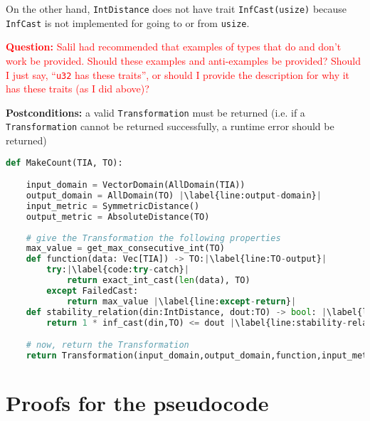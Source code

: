 \documentclass[11pt,letterpaper]{article}
\newcommand{\question}[1]{\textcolor{red}{\textbf{Question:} #1}}
\theoremstyle{definition}
\begin{document}
\begin{itemize}
\begin{itemize}
        On the other hand, \texttt{IntDistance} does not have trait \texttt{InfCast(usize)} because \texttt{InfCast} is not implemented for going to or from \texttt{usize}.
        
    \end{itemize}
    
    \question{Salil had recommended that examples of types that do and don't work be provided. Should these examples and anti-examples be provided? Should I just say, ``\texttt{u32} has these traits'', or should I provide the description for why it has these traits (as I did above)?}
\end{itemize}

\textbf{Postconditions:} a valid \texttt{Transformation} must be returned (i.e. if a \texttt{Transformation} cannot be returned successfully, a runtime error should be returned)

\begin{lstlisting}[language = Python, escapechar=|]
def MakeCount(TIA, TO):

    input_domain = VectorDomain(AllDomain(TIA))
    output_domain = AllDomain(TO) |\label{line:output-domain}|
    input_metric = SymmetricDistance()
    output_metric = AbsoluteDistance(TO)
    
    # give the Transformation the following properties
    max_value = get_max_consecutive_int(TO) 
    def function(data: Vec[TIA]) -> TO:|\label{line:TO-output}|
        try:|\label{code:try-catch}|
            return exact_int_cast(len(data), TO)
        except FailedCast:
            return max_value |\label{line:except-return}|
    def stability_relation(din:IntDistance, dout:TO) -> bool: |\label{line:din-dout-type}|
        return 1 * inf_cast(din,TO) <= dout |\label{line:stability-relation}|

    # now, return the Transformation
    return Transformation(input_domain,output_domain,function,input_metric,output_metric,stability_relation)

\end{lstlisting}

\section{Proofs for the pseudocode}
\end{document}
